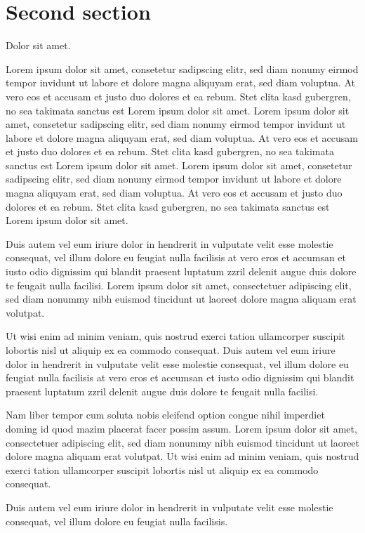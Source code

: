 \section{Second section}

Dolor sit amet.

Lorem ipsum dolor sit amet, consetetur sadipscing elitr, sed diam nonumy eirmod tempor invidunt ut labore et dolore
magna aliquyam erat, sed diam voluptua. At vero eos et accusam et justo duo dolores et ea rebum. Stet clita kasd
gubergren, no sea takimata sanctus est Lorem ipsum dolor sit amet. Lorem ipsum dolor sit amet, consetetur sadipscing
elitr, sed diam nonumy eirmod tempor invidunt ut labore et dolore magna aliquyam erat, sed diam voluptua. At vero eos
et accusam et justo duo dolores et ea rebum. Stet clita kasd gubergren, no sea takimata sanctus est Lorem ipsum dolor
sit amet. Lorem ipsum dolor sit amet, consetetur sadipscing elitr, sed diam nonumy eirmod tempor invidunt ut labore
et dolore magna aliquyam erat, sed diam voluptua. At vero eos et accusam et justo duo dolores et ea rebum. Stet clita
kasd gubergren, no sea takimata sanctus est Lorem ipsum dolor sit amet.

Duis autem vel eum iriure dolor in hendrerit in vulputate velit esse molestie consequat, vel illum dolore eu feugiat
nulla facilisis at vero eros et accumsan et iusto odio dignissim qui blandit praesent luptatum zzril delenit augue
duis dolore te feugait nulla facilisi. Lorem ipsum dolor sit amet, consectetuer adipiscing elit, sed diam nonummy
nibh euismod tincidunt ut laoreet dolore magna aliquam erat volutpat.

Ut wisi enim ad minim veniam, quis nostrud exerci tation ullamcorper suscipit lobortis nisl ut aliquip ex ea commodo
consequat. Duis autem vel eum iriure dolor in hendrerit in vulputate velit esse molestie consequat, vel illum dolore
eu feugiat nulla facilisis at vero eros et accumsan et iusto odio dignissim qui blandit praesent luptatum zzril
delenit augue duis dolore te feugait nulla facilisi.

Nam liber tempor cum soluta nobis eleifend option congue nihil imperdiet doming id quod mazim placerat facer possim
assum. Lorem ipsum dolor sit amet, consectetuer adipiscing elit, sed diam nonummy nibh euismod tincidunt ut laoreet
dolore magna aliquam erat volutpat. Ut wisi enim ad minim veniam, quis nostrud exerci tation ullamcorper suscipit
lobortis nisl ut aliquip ex ea commodo consequat.

Duis autem vel eum iriure dolor in hendrerit in vulputate velit esse molestie consequat, vel illum dolore eu feugiat
nulla facilisis.

